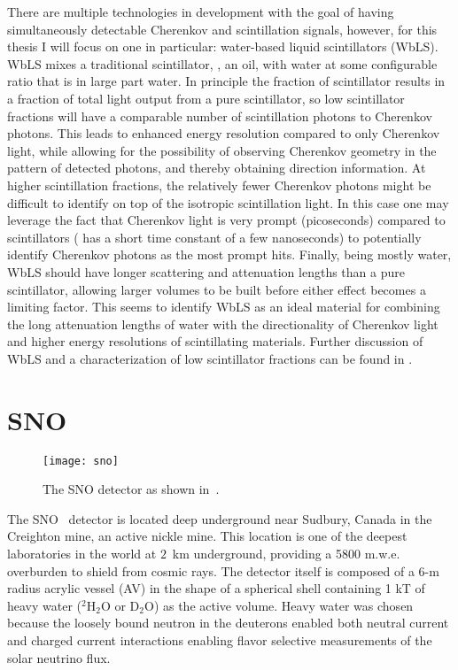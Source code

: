 There are multiple technologies in development with the goal of having simultaneously detectable Cherenkov and scintillation signals, however, for this thesis I will focus on one in particular: water-based liquid scintillators (WbLS).
WbLS mixes a traditional scintillator, {\labppo}, an oil, with water at some configurable ratio that is in large part water.
In principle the fraction of scintillator results in a fraction of total light output from a pure scintillator, so low scintillator fractions will have a comparable number of scintillation photons to Cherenkov photons. 
This leads to enhanced energy resolution compared to only Cherenkov light, while allowing for the possibility of observing Cherenkov geometry in the pattern of detected photons, and thereby obtaining direction information.
At higher scintillation fractions, the relatively fewer Cherenkov photons might be difficult to identify on top of the isotropic scintillation light.
In this case one may leverage the fact that Cherenkov light is very prompt (picoseconds) compared to scintillators ({\labppo} has a short time constant of a few nanoseconds) to potentially identify Cherenkov photons as the most prompt hits.
Finally, being mostly water, WbLS should have longer scattering and attenuation lengths than a pure scintillator, allowing larger volumes to be built before either effect becomes a limiting factor.
This seems to identify WbLS as an ideal material for combining the long attenuation lengths of water with the directionality of Cherenkov light and higher energy resolutions of scintillating materials.
Further discussion of WbLS and a characterization of low scintillator fractions can be found in .

\section{SNO}

\begin{figure}
\centering
\texttt{[image: sno]}
\caption{\label{fig:sno}The SNO detector as shown in~\cite{3phase}.}
\end{figure}

The SNO~\cite{sno} detector is located deep underground near Sudbury, Canada in the Creighton mine, an active nickle mine.
This location is one of the deepest laboratories in the world at $2$~km underground, providing a 5800 m.w.e. overburden to shield from cosmic rays.
The detector itself is composed of a 6-m radius acrylic vessel (AV) in the shape of a spherical shell containing 1 kT of heavy water ($^2$H$_2$O or D$_2$O) as the active volume.
Heavy water was chosen because the loosely bound neutron in the deuterons enabled both neutral current and charged current interactions enabling flavor selective measurements of the solar neutrino flux.


